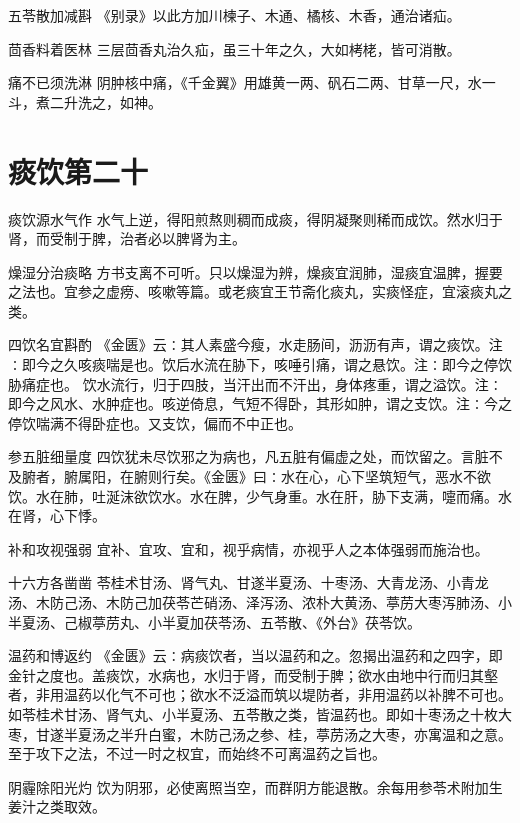 \documentclass[a4paper,12pt,UTF8,twoside]{ctexbook}
\begin{document}
    五苓散加减斟
    《别录》以此方加川楝子、木通、橘核、木香，通治诸疝。
    
    茴香料着医林
    三层茴香丸治久疝，虽三十年之久，大如栲栳，皆可消散。
    
    痛不已须洗淋
    阴肿核中痛，《千金翼》用雄黄一两、矾石二两、甘草一尺，水一斗，煮二升洗之，如神。
    
    
    
    \chapter{痰饮第二十}
        
    痰饮源水气作
    水气上逆，得阳煎熬则稠而成痰，得阴凝聚则稀而成饮。然水归于肾，而受制于脾，治者必以脾肾为主。
    
    燥湿分治痰略
    方书支离不可听。只以燥湿为辨，燥痰宜润肺，湿痰宜温脾，握要之法也。宜参之虚痨、咳嗽等篇。或老痰宜王节斋化痰丸，实痰怪症，宜滚痰丸之类。
    
    四饮名宜斟酌
    《金匮》云∶其人素盛今瘦，水走肠间，沥沥有声，谓之痰饮。注∶即今之久咳痰喘是也。饮后水流在胁下，咳唾引痛，谓之悬饮。注∶即今之停饮胁痛症也。
    饮水流行，归于四肢，当汗出而不汗出，身体疼重，谓之溢饮。注∶即今之风水、水肿症也。咳逆倚息，气短不得卧，其形如肿，谓之支饮。注∶今之停饮喘满不得卧症也。又支饮，偏而不中正也。
    
    参五脏细量度
    四饮犹未尽饮邪之为病也，凡五脏有偏虚之处，而饮留之。言脏不及腑者，腑属阳，在腑则行矣。《金匮》曰∶水在心，心下坚筑短气，恶水不欲饮。水在肺，吐涎沫欲饮水。水在脾，少气身重。水在肝，胁下支满，嚏而痛。水在肾，心下悸。
    
    补和攻视强弱
    宜补、宜攻、宜和，视乎病情，亦视乎人之本体强弱而施治也。
    
    十六方各凿凿
    苓桂术甘汤、肾气丸、甘遂半夏汤、十枣汤、大青龙汤、小青龙汤、木防己汤、木防己加茯苓芒硝汤、泽泻汤、浓朴大黄汤、葶苈大枣泻肺汤、小半夏汤、己椒葶苈丸、小半夏加茯苓汤、五苓散、《外台》茯苓饮。
    
    温药和博返约
    《金匮》云∶病痰饮者，当以温药和之。忽揭出温药和之四字，即金针之度也。盖痰饮，水病也，水归于肾，而受制于脾；欲水由地中行而归其壑者，非用温药以化气不可也；欲水不泛溢而筑以堤防者，非用温药以补脾不可也。如苓桂术甘汤、肾气丸、小半夏汤、五苓散之类，皆温药也。即如十枣汤之十枚大枣，甘遂半夏汤之半升白蜜，木防己汤之参、桂，葶苈汤之大枣，亦寓温和之意。至于攻下之法，不过一时之权宜，而始终不可离温药之旨也。
    
    阴霾除阳光灼
    饮为阴邪，必使离照当空，而群阴方能退散。余每用参苓术附加生姜汁之类取效。
    
\end{document}
